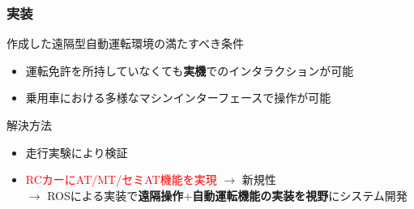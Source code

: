 \documentclass[unicode, 9pt, aspectratio=169]{beamer}
\begin{document}
\begin{frame}
  \frametitle{実装}
  \centering
  \begin{minipage}{.8\linewidth}
  \begin{exampleblock}{作成した遠隔型自動運転環境の満たすべき条件}
    \begin{itemize}
      \item 運転免許を所持していなくても\textbf{実機}でのインタラクションが可能
      \item 乗用車における多様なマシンインターフェースで操作が可能
    \end{itemize}
  \end{exampleblock}
\end{minipage}
  
  \begin{minipage}{.8\linewidth}
    \begin{alertblock}{解決方法}
      \begin{itemize}
        \item 走行実験により検証
        \item \textcolor{red}{RCカーにAT/MT/セミAT機能を実現} $\to$ 新規性
        \\$\to$ ROSによる実装で\textbf{遠隔操作$+$自動運転機能の実装を視野}にシステム開発
      \end{itemize}
    \end{alertblock}
  \end{minipage}
\end{frame}
\end{document}
